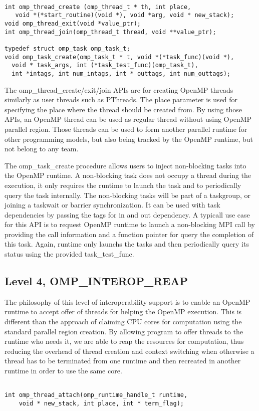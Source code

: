 \lstset{basicstyle=\sffamily\small,language=c, numbersep=1pt}
\begin{lstlisting}[frame=single]  % Start your code-block

int omp_thread_create (omp_thread_t * th, int place,  
   void *(*start_routine)(void *), void *arg, void * new_stack);
void omp_thread_exit(void *value_ptr);
int omp_thread_join(omp_thread_t thread, void **value_ptr);

typedef struct omp_task omp_task_t;
void omp_task_create(omp_task_t * t, void *(*task_func)(void *), 
  void * task_args, int (*task_test_func)(omp_task_t), 
  int *intags, int num_intags, int * outtags, int num_outtags);
\end{lstlisting}
The {\sf omp\_thread\_create/exit/join} APIs are for creating OpenMP threads similarly as user threads such 
as PThreads. The {\sf place} parameter is used for specifying the place where the thread should be created from.  
By using those APIs, an OpenMP thread
can be used as regular thread without using OpenMP parallel region. Those threads can be used to form another parallel runtime for other programming
models, but also being tracked by the OpenMP runtime, but not belong to any team. 

The {\sf omp\_task\_create} procedure allows users to inject non-blocking tasks into the OpenMP runtime. A non-blocking task does not occupy
a thread during the execution, it only requires the runtime to launch the task and to periodically query the task internally. The non-blocking
tasks will be part of a {\sf taskgroup}, or joining a {\sf taskwait} or {\sf barrier} synchronization. It can be used with task dependencies by 
passing the tags for in and out dependency. A typicall use case for this API is to request OpenMP runtime to launch a non-blocking MPI call by providing the call information and a function pointer for query the completion of this task. Again, runtime only launchs the tasks and then periodically
query its status using the provided {\sf task\_test\_func}.

\subsection{Level 4, OMP\_INTEROP\_REAP} 
The philosophy of this level of interoperability support is to enable an OpenMP runtime to accept offer of threads 
for helping the OpenMP execution. This is different than the approach of claiming CPU cores 
for computation using the standard parallel region creation. By allowing program to offer threads to the runtime who needs it, we are able to 
reap the resources for computation, thus reducing the overhead of thread creation and context switching when otherwise 
a thread has to be terminated from
one runtime and then recreated in another runtime in order to use the same core. 
\lstset{basicstyle=\sffamily\small,language=c, numbersep=1pt}
\begin{lstlisting}[frame=single]  % Start your code-block

int omp_thread_attach(omp_runtime_handle_t runtime, 
    void * new_stack, int place, int * term_flag);
\end{lstlisting}

